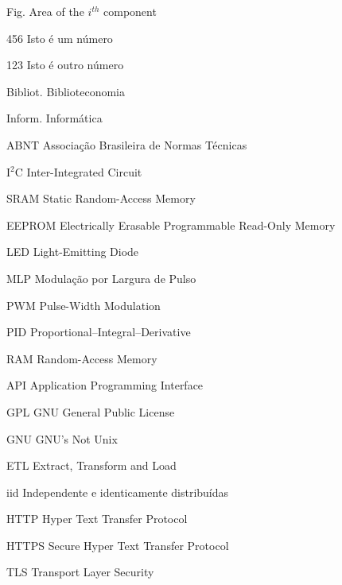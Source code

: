 \begin{siglas}
	\item[Fig.] Area of the $i^{th}$ component
	\item[456] Isto é um número
	\item[123] Isto é outro número
	\item [Bibliot.] Biblioteconomia
	\item [Inform.]  Informática
	\item [ABNT] Associação Brasileira de Normas Técnicas
	\item [I$^2$C] Inter-Integrated Circuit
	\item [SRAM] Static Random-Access Memory
	\item [EEPROM]	Electrically Erasable Programmable Read-Only Memory
	\item [LED] Light-Emitting Diode
	\item [MLP] Modulação por Largura de Pulso
	\item [PWM] Pulse-Width Modulation
	\item [PID] Proportional–Integral–Derivative
	\item [RAM] Random-Access Memory
	\item [API] Application Programming Interface
	\item [GPL] GNU General Public License
	\item [GNU] GNU's Not Unix
	\item [ETL] Extract, Transform and Load
	\item [iid] Independente e identicamente distribuídas
	\item [HTTP] Hyper Text Transfer Protocol
	\item [HTTPS] Secure Hyper Text Transfer Protocol
	\item [TLS] Transport Layer Security
\end{siglas}
